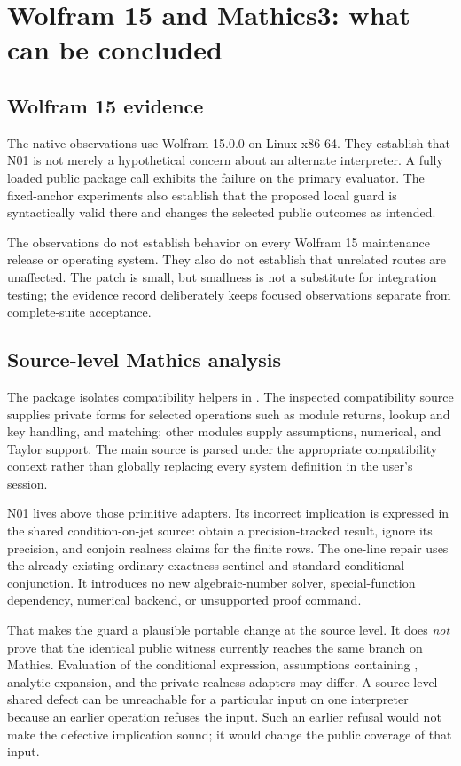 \documentclass[11pt,letterpaper]{article}
\newcommand{\code}[1]{\texttt{\small\detokenize{#1}}}
\begin{document}
\section{Wolfram 15 and Mathics3: what can be concluded}
\subsection{Wolfram 15 evidence}
The native observations use Wolfram 15.0.0 on Linux x86-64. They establish that N01 is not merely a hypothetical concern about an alternate interpreter. A fully loaded public package call exhibits the failure on the primary evaluator. The fixed-anchor experiments also establish that the proposed local guard is syntactically valid there and changes the selected public outcomes as intended.

The observations do not establish behavior on every Wolfram 15 maintenance release or operating system. They also do not establish that unrelated routes are unaffected. The patch is small, but smallness is not a substitute for integration testing; the evidence record deliberately keeps focused observations separate from complete-suite acceptance.

\subsection{Source-level Mathics analysis}
The package isolates compatibility helpers in \code{AsymptoticAnalysis`Mathics`}. The inspected compatibility source supplies private forms for selected operations such as module returns, lookup and key handling, and matching; other modules supply assumptions, numerical, and Taylor support. The main source is parsed under the appropriate compatibility context rather than globally replacing every system definition in the user's session.\cite{mathicscompat,mathicsassumptions,mathicstaylor,mathicsnumerical}

N01 lives above those primitive adapters. Its incorrect implication is expressed in the shared condition-on-jet source: obtain a precision-tracked result, ignore its precision, and conjoin realness claims for the finite rows. The one-line repair uses the already existing ordinary exactness sentinel and standard conditional conjunction. It introduces no new algebraic-number solver, special-function dependency, numerical backend, or unsupported proof command.

That makes the guard a plausible portable change at the source level. It does \emph{not} prove that the identical public witness currently reaches the same branch on Mathics. Evaluation of the conditional expression, assumptions containing \code{a == I}, analytic expansion, and the private realness adapters may differ. A source-level shared defect can be unreachable for a particular input on one interpreter because an earlier operation refuses the input. Such an earlier refusal would not make the defective implication sound; it would change the public coverage of that input.
\end{document}
